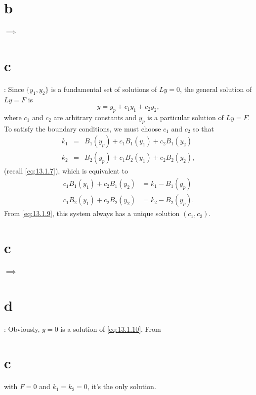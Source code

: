 \part{b} $\implies$ \part{c}: Since $\{y_{1},y_{2}\}$ is a fundamental set of solutions of $Ly=0$,
the general solution of $Ly=F$ is
\[
  y=y_{p}+c_{1}y_{1}+c_{2}y_{2},
\]
where $c_{1}$ and $c_{2}$ are arbitrary constants and $y_{p}$ is a particular solution of $Ly=F$. To
satisfy the boundary conditions, we must choose $c_{1}$ and $c_{2}$ so that
\begin{eqnarray*}
  k_{1} & = & B_{1}(y_{p})+c_{1}B_{1}(y_{1})+c_{2}B_{1}(y_{2}) \\
  k_{2} & = & B_{2}(y_{p})+c_{1}B_{2}(y_{1})+c_{2}B_{2}(y_{2}),
\end{eqnarray*}
(recall \eqref{eq:13.1.7}), which is equivalent to
\[
  \begin{aligned}
    c_{1}B_{1}(y_{1})+c_{2}B_{1}(y_{2}) & =k_{1}-B_{1}(y_{p})  \\
    c_{1}B_{2}(y_{1})+c_{2}B_{2}(y_{2}) & =k_{2}-B_{2}(y_{p}).
  \end{aligned}
\]
From \eqref{eq:13.1.9}, this system always has a unique solution $(c_{1},c_{2})$.

\part{c} $\implies$ \part{d}: Obviously, $y=0$ is a solution of \eqref{eq:13.1.10}. From \part{c}
with $F=0$ and $k_{1}=k_{2}=0$, it's the only solution.

